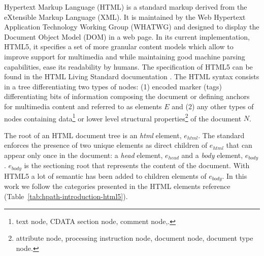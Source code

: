 Hypertext Markup Language (HTML) is a standard markup derived from the eXtensible Markup Language (XML). It is maintained by the Web Hypertext Application Technology Working Group (WHATWG) and designed to display the Document Object Model (DOM) in a web page. In its current implementation, HTML5, it specifies a set of more granular content models which allow to improve support for multimedia and while maintaining good machine parsing capabilities, ease its readability by humans. The specification of HTML5 can be found in the HTML Living Standard documentation \cite{WHATWG2021}. The HTML syntax consists in a tree differentiating two types of nodes: (1) encoded marker (tags) differentiating bits of information composing the document or defining anchors for multimedia content and referred to as elements $E$ and (2) any other types of nodes containing data\footnote{text node, CDATA section node, comment node,.} or lower level structural properties\footnote{attribute node, processing instruction node, document node, document type node.} of the document $N$.

The root of an HTML document tree is an \emph{html} element, $e_{html}$. The standard enforces the presence of two unique elements as direct children of $e_{html}$ that can appear only once in the document: a \emph{head} element, $e_{head}$ and a \emph{body} element, $e_{body}$. $e_{body}$ is the sectioning root that represents the content of the document. With HTML5 a lot of semantic has been added to children elements of $e_{body}$. In this work we follow the categories presented in the HTML elements reference \cite{MDN2020,WHATWG2021} (Table~\ref{tab:hpath-introduction-html5}).

